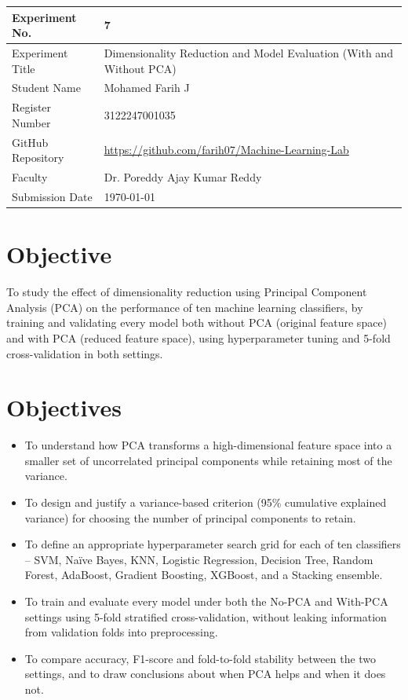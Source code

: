 \documentclass[12pt,a4paper]{article}
\begin{document}
\begin{tabular}{|p{4cm}|p{11cm}|}
\hline
Experiment No. & 7 \\ \hline
Experiment Title & Dimensionality Reduction and Model Evaluation (With and Without PCA)
\\ \hline
Student Name & Mohamed Farih J \\ \hline
Register Number & 3122247001035 \\ \hline
GitHub Repository & \url{https://github.com/farih07/Machine-Learning-Lab} \\ \hline
Faculty & Dr. Poreddy Ajay Kumar Reddy \\ \hline
Submission Date & \today \\ \hline
\end{tabular}

\section{Objective}
To study the effect of dimensionality reduction using Principal Component Analysis (PCA) on the performance of ten machine learning classifiers, by training and validating every model both without PCA (original feature space) and with PCA (reduced feature space), using hyperparameter tuning and 5-fold cross-validation in both settings.

\section{Objectives}
\begin{itemize}[leftmargin=*]
    \item To understand how PCA transforms a high-dimensional feature space into a smaller set of uncorrelated principal components while retaining most of the variance.
    \item To design and justify a variance-based criterion (95\% cumulative explained variance) for choosing the number of principal components to retain.
    \item To define an appropriate hyperparameter search grid for each of ten classifiers -- SVM, Na\"ive Bayes, KNN, Logistic Regression, Decision Tree, Random Forest, AdaBoost, Gradient Boosting, XGBoost, and a Stacking ensemble.
    \item To train and evaluate every model under both the No-PCA and With-PCA settings using 5-fold stratified cross-validation, without leaking information from validation folds into preprocessing.
    \item To compare accuracy, F1-score and fold-to-fold stability between the two settings, and to draw conclusions about when PCA helps and when it does not.
\end{itemize}
\end{document}
